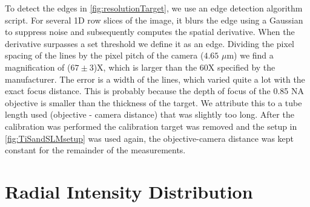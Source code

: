 To detect the edges in \cref{fig:resolutionTarget}, we use an edge detection algorithm script.
For several 1D row slices of the image, it blurs the edge using a Gaussian to suppress noise and subsequently computes the spatial derivative. 
When the derivative surpasses a set threshold we define it as an edge.
Dividing the pixel spacing of the lines by the pixel pitch of the camera ($4.65$ $\mu$m) we find a magnification of ($67 \pm 3$)X, which is larger than the 60X specified by the manufacturer. 
The error is a width of the lines, which varied quite a lot with the exact focus distance. 
This is probably because the depth of focus of the 0.85 NA objective is smaller than the thickness of the target. 
We attribute this to a tube length used (objective - camera distance) that was slightly too long.
After the calibration was performed the calibration target was removed and the setup in \cref{fig:TiSandSLMsetup} was used again, the objective-camera distance was kept constant for the remainder of the measurements.

\section{Radial Intensity Distribution}\label{sec:TweezerRadial}

